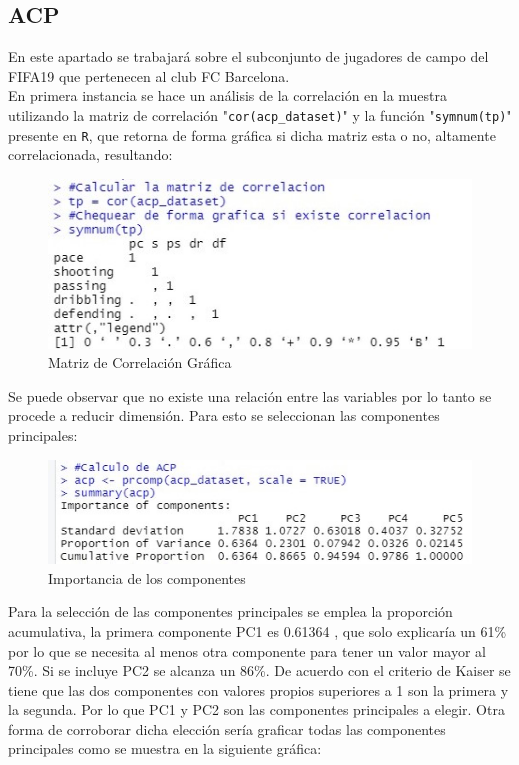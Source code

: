 \documentclass[a4paper,10pt,twocolumn]{article}
\begin{document}
\subsection*{ACP}

En este apartado se trabajará sobre el subconjunto de jugadores de campo del FIFA19 que pertenecen al club FC Barcelona.\\
En primera instancia se hace un análisis de la correlación en la muestra utilizando la matriz de correlación  "\verb|cor(acp_dataset)|" y la función "\verb|symnum(tp)|" presente en \verb|R|, que retorna de forma gráfica si dicha matriz esta o no, altamente correlacionada, resultando:

\begin{figure}[h]
	\includegraphics[scale=0.7]{./imgs/acp_correlation.jpg}
	\caption{ Matriz de Correlación Gráfica}
\end{figure}

\newpage

Se puede observar que no existe una relación entre las variables por lo tanto se procede a reducir dimensión. Para esto se seleccionan las componentes principales:

\begin{figure}[h]
	\includegraphics[scale=0.6]{./imgs/acp_summary.jpg}
	\caption{Importancia de los componentes}
\end{figure}

Para la selección de las componentes principales se emplea la proporción acumulativa, la primera componente PC1 es 0.61364 , que solo explicaría un 61\% por lo que se necesita al menos otra componente para tener un valor mayor al 70\%. Si se incluye PC2 se alcanza un 86\%. De acuerdo con el criterio de Kaiser se tiene que las dos componentes con valores propios superiores a 1 son la primera y la segunda. Por lo que PC1 y PC2 son las componentes principales a elegir. Otra forma de corroborar dicha elección sería graficar todas las componentes principales como se muestra en la siguiente gráfica:
\end{document}
